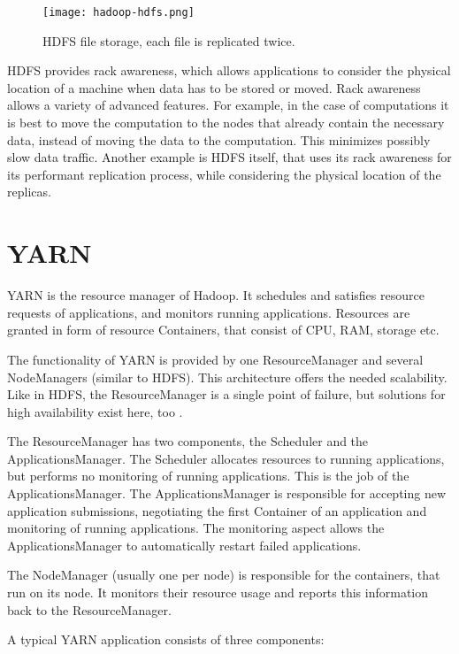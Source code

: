 \begin{figure}[ht!]
  \centering
  \texttt{[image: hadoop-hdfs.png]}
  \caption{HDFS file storage, each file is replicated twice.}
  \label{fig:hadoop-hdfs}
\end{figure}

HDFS provides rack awareness, which allows applications to consider the physical location of a machine when data has to be stored or moved. Rack awareness allows a variety of advanced features. For example, in the case of computations it is best to move the computation to the nodes that already contain the necessary data, instead of moving the data to the computation. This minimizes possibly slow data traffic. Another example is HDFS itself, that uses its rack awareness for its performant replication process, while considering the physical location of the replicas.

\section{YARN}
\label{chap:hadoop:yarn}
YARN is the resource manager of Hadoop. It schedules and satisfies resource requests of applications, and monitors running applications. Resources are granted in form of resource Containers, that consist of CPU, RAM, storage etc.

The functionality of YARN is provided by one ResourceManager and several NodeManagers (similar to HDFS). This architecture offers the needed scalability. Like in HDFS, the ResourceManager is a single point of failure, but solutions for high availability exist here, too \cite{yarn-ha}.

The ResourceManager has two components, the Scheduler and the ApplicationsManager. The Scheduler allocates resources to running applications, but performs no monitoring of running applications. This is the job of the ApplicationsManager. The ApplicationsManager is responsible for accepting new application submissions, negotiating the first Container of an application and monitoring of running applications. The monitoring aspect allows the ApplicationsManager to automatically restart failed applications.

The NodeManager (usually one per node) is responsible for the containers, that run on its node. It monitors their resource usage and reports this information back to the ResourceManager.

A typical YARN application consists of three components:

